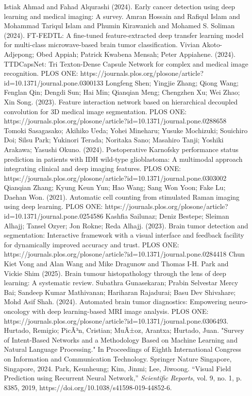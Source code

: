 \documentclass[runningheads]{llncs}
\begin{document}
\begin{thebibliography}{00}
     Istiak Ahmad and Fahad Alqurashi (2024). Early cancer detection using deep learning and medical imaging: A survey.
 Amran Hossain and Rafiqul Islam and Mohammad Tariqul Islam and Phumin Kirawanich and Mohamed S. Soliman (2024). FT-FEDTL: A fine-tuned feature-extracted deep transfer learning model for multi-class microwave-based brain tumor classification.
 Vivian Akoto-Adjepong; Obed Appiah; Patrick Kwabena Mensah; Peter Appiahene. (2024). TTDCapsNet: Tri Texton-Dense Capsule Network for complex and medical image recognition. PLOS ONE: https://journals.plos.org/plosone/article?id=10.1371/journal.pone.0300133
 Longfeng Shen; Yingjie Zhang; Qiong Wang; Fenglan Qin; Dengdi Sun; Hai Min; Qianqian Meng; Chengzhen Xu; Wei Zhao; Xin Song. (2023). Feature interaction network based on hierarchical decoupled convolution for 3D medical image segmentation. PLOS ONE: https://journals.plos.org/plosone/article?id=10.1371/journal.pone.0288658
 Tomoki Sasagasako; Akihiko Ueda; Yohei Mineharu; Yusuke Mochizuki; Souichiro Doi; Silsu Park; Yukinori Terada; Noritaka Sano; Masahiro Tanji; Yoshiki Arakawa; Yasushi Okuno. (2024). Postoperative Karnofsky performance status prediction in patients with IDH wild-type glioblastoma: A multimodal approach integrating clinical and deep imaging features. PLOS ONE: https://journals.plos.org/plosone/article?id=10.1371/journal.pone.0303002
 Qianqian Zhang; Kyung Keun Yun; Hao Wang; Sang Won Yoon; Fake Lu; Daehan Won. (2021). Automatic cell counting from stimulated Raman imaging using deep learning. PLOS ONE: https://journals.plos.org/plosone/article?id=10.1371/journal.pone.0254586
 Kashfia Sailunaz; Deniz Bestepe; Sleiman Alhajj; Tansel Ozyer; Jon Rokne; Reda Alhajj. (2023). Brain tumor detection and segmentation: Interactive framework with a visual interface and feedback facility for dynamically improved accuracy and trust. PLOS ONE: https://journals.plos.org/plosone/article?id=10.1371/journal.pone.0284418
 Chun Kiet Vong and Alan Wang and Mike Dragunow and Thomas I-H. Park and Vickie Shim (2025). Brain tumour histopathology through the lens of deep learning: A systematic review.
 Subathra Gunasekaran; Prabin Selvestar Mercy Bai; Sandeep Kumar Mathivanan; Hariharan Rajadurai; Basu Dev Shivahare; Mohd Asif Shah. (2024). Automated brain tumor diagnostics: Empowering neuro-oncology with deep learning-based MRI image analysis. PLOS ONE: https://journals.plos.org/plosone/article?id=10.1371/journal.pone.0306493.
    Hurtado, Remigio; PicÃ³n, Cristian; MuÃ±oz, Arantxa; Hurtado, Juan.
    "Survey of Intent-Based Networks and a Methodology Based on Machine Learning and Natural Language Processing."
    In Proceedings of Eighth International Congress on Information and Communication Technology.
    Springer Nature Singapore, Singapore, 2024.
    Park, Keunheung; Kim, Jinmi; Lee, Jiwoong. 
    ``Visual Field Prediction using Recurrent Neural Network,'' 
    \emph{Scientific Reports}, 
    vol. 9, no. 1, p. 8385, 
    2019, 
    https://doi.org/10.1038/s41598-019-44852-6.
    

\end{thebibliography}
\end{document}

